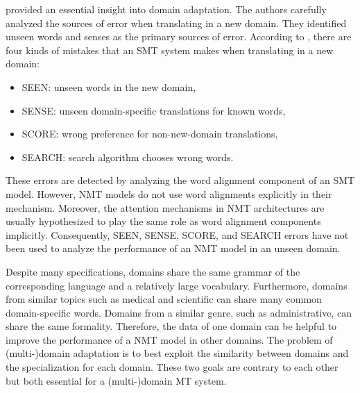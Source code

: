 \citet{Carpuat13domain} provided an essential insight into domain adaptation. The authors carefully analyzed the sources of error when translating in a new domain. They identified unseen words and senses as the primary sources of error. According to \citet{Carpuat13domain}, there are four kinds of mistakes that an SMT system makes when translating in a new domain:
\begin{itemize}
	\item SEEN: unseen words in the new domain,
	\item SENSE: unseen domain-specific translations for known words,
	\item SCORE: wrong preference for non-new-domain translations,
	\item SEARCH: search algorithm chooses wrong words.
\end{itemize}
These errors are detected by analyzing the word alignment component of an SMT model. However, NMT models do not use word alignments explicitly in their mechanism. Moreover, the attention mechanisms in NMT architectures are usually hypothesized to play the same role as word alignment components implicitly. Consequently, SEEN, SENSE, SCORE, and SEARCH errors have not been used to analyze the performance of an NMT model in an unseen domain.

Despite many specifications, domains share the same grammar of the corresponding language and a relatively large vocabulary. Furthermore, domains from similar topics such as medical and scientific can share many common domain-specific words. Domains from a similar genre, such as administrative, can share the same formality. Therefore, the data of one domain can be helpful to improve the performance of a NMT model in other domains. The problem of (multi-)domain adaptation is to best exploit the similarity between domains and the specialization for each domain. These two goals are contrary to each other but both essential for a (multi-)domain MT system.

